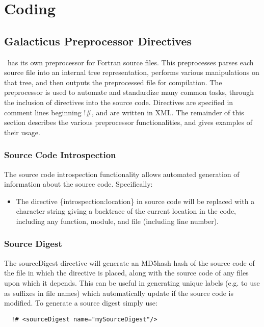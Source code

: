 \chapter{Coding \glc}

\section{Galacticus Preprocessor Directives}

\glc\ has its own preprocessor for Fortran source files. This preprocesses parses each source file into an internal tree representation, performs various manipulations on that tree, and then outputs the preprocessed file for compilation. The preprocessor is used to automate and standardize many common tasks, through the inclusion of directives into the source code. Directives are specified in comment lines beginning {\normalfont \ttfamily !\#}, and are written in XML. The remainder of this section describes the various preprocessor functionalities, and gives examples of their usage.

\subsection{Source Code Introspection}

The source code introspection functionality allows automated generation of information about the source code. Specifically:
\begin{itemize}
\item The directive {\normalfont \ttfamily \{introspection:location\}} in source code will be replaced with a character string giving a backtrace of the current location in the code, including any function, module, and file (including line number).
\end{itemize}

\subsection{Source Digest}

The {\normalfont \ttfamily sourceDigest} directive will generate an \gls{MD5hash} hash of the source code of the file in which the directive is placed, along with the source code of any files upon which it depends. This can be useful in generating unique labels (e.g. to use as suffixes in file names) which automatically update if the source code is modified. To generate a source digest simply use:

\begin{lstlisting}
  !# <sourceDigest name="mySourceDigest"/>
\end{lstlisting}

